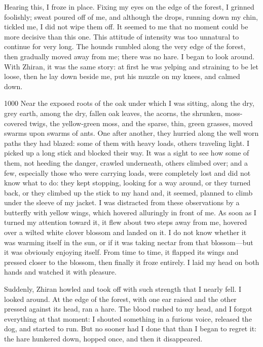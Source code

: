 Hearing this, I froze in place. Fixing my eyes on the edge of the forest, I grinned foolishly; sweat poured off of me, and although the drops, running down my chin, tickled me, I did not wipe them off. It seemed to me that no moment could be more decisive than this one. This attitude of intensity was too unnatural to continue for very long. The hounds rumbled along the very edge of the forest, then gradually moved away from me; there was no hare. I began to look around. With Zhiran, it was the same story: at first he was yelping and straining to be let loose, then he lay down beside me, put his muzzle on my knees, and calmed down.

\begin{tolerant}{1000}
Near the exposed roots of the oak under which I was sitting, along the dry, grey earth, among the dry, fallen oak leaves, the acorns, the shrunken, moss-covered twigs, the yellow-green moss, and the sparse, thin, green grasses, moved swarms upon swarms of ants. One after another, they hurried along the well worn paths they had blazed: some of them with heavy loads, others traveling light. I picked up a long stick and blocked their way. It was a sight to see how some of them, not heeding the danger, crawled underneath, others climbed over; and a few, especially those who were carrying loads, were completely lost and did not know what to do: they kept stopping, looking for a way around, or they turned back, or they climbed up the stick to my hand and, it seemed, planned to climb under the sleeve of my jacket. I was distracted from these observations by a butterfly with yellow wings, which hovered alluringly in front of me. As soon as I turned my attention toward it, it flew about two steps away from me, hovered over a wilted white clover blossom and landed on it. I do not know whether it was warming itself in the sun, or if it was taking nectar from that blossom---but it was obviously enjoying itself. From time to time, it flapped its wings and pressed closer to the blossom, then finally it froze entirely. I laid my head on both hands and watched it with pleasure.
\end{tolerant}

Suddenly, Zhiran howled and took off with such strength that I nearly fell. I looked around. At the edge of the forest, with one ear raised and the other pressed against its head, ran a hare. The blood rushed to my head, and I forgot everything at that moment: I shouted something in a furious voice, released the dog, and started to run. But no sooner had I done that than I began to regret it: the hare hunkered down, hopped once, and then it disappeared.

